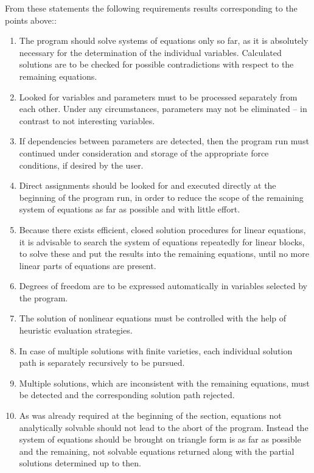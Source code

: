 From these statements the following requirements results corresponding to the points  above::


\begin{enumerate}
\item The program should solve systems of equations only so far, as it is absolutely necessary for the determination of the individual variables. Calculated solutions are to be checked for possible contradictions with respect to the remaining equations.

\item 
Looked for variables and parameters must to be processed separately from each other.  Under any circumstances, parameters may not be  eliminated -- in contrast to not interesting variables.

\item If dependencies between parameters are detected, then the program run must continued under consideration and storage of the appropriate force conditions, if  desired by the user.

\item \label{AnfImmed}
Direct assignments should be looked for  and executed directly at the beginning of the program run, in order to reduce the scope of the remaining system of equations as far as possible and with little effort.

\item \label{AnfLinear}
Because there exists  efficient, closed solution procedures for linear equations, it is advisable to search the system of equations repeatedly for linear blocks, to solve these and put the results into the remaining  equations, until no more linear parts of equations are present.

\item 
Degrees of freedom are to be expressed automatically in variables selected by the program.

\item \label{AnfNonlinear}
The solution of nonlinear equations must be controlled with the help of heuristic evaluation strategies.

\item 
In case of multiple solutions with finite varieties, each individual solution path is separately recursively to be pursued.

\item 
Multiple solutions, which are inconsistent with the remaining equations, must be detected and the corresponding solution path rejected.

\item 
As was already required at the beginning of the section,  equations not analytically solvable should not lead to the abort of the program. Instead the system of equations should be brought  on triangle form is as far as possible  and the  remaining, not solvable equations returned along with the partial solutions determined up to then.

\end{enumerate}


